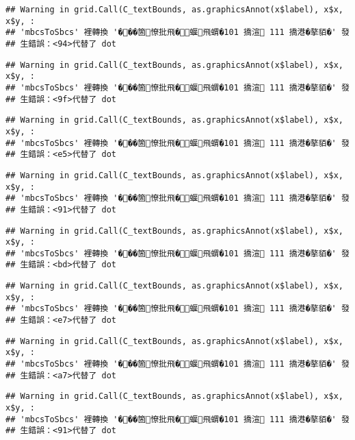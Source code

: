 \documentclass[
]{article}
\begin{document}
\begin{verbatim}
## Warning in grid.Call(C_textBounds, as.graphicsAnnot(x$label), x$x, x$y, :
## 'mbcsToSbcs' 裡轉換 '���箇憭批飛�蝘飛蝟�101 撟渲 111 撟港�摮貊�' 發
## 生錯誤：<94>代替了 dot
\end{verbatim}

\begin{verbatim}
## Warning in grid.Call(C_textBounds, as.graphicsAnnot(x$label), x$x, x$y, :
## 'mbcsToSbcs' 裡轉換 '���箇憭批飛�蝘飛蝟�101 撟渲 111 撟港�摮貊�' 發
## 生錯誤：<9f>代替了 dot
\end{verbatim}

\begin{verbatim}
## Warning in grid.Call(C_textBounds, as.graphicsAnnot(x$label), x$x, x$y, :
## 'mbcsToSbcs' 裡轉換 '���箇憭批飛�蝘飛蝟�101 撟渲 111 撟港�摮貊�' 發
## 生錯誤：<e5>代替了 dot
\end{verbatim}

\begin{verbatim}
## Warning in grid.Call(C_textBounds, as.graphicsAnnot(x$label), x$x, x$y, :
## 'mbcsToSbcs' 裡轉換 '���箇憭批飛�蝘飛蝟�101 撟渲 111 撟港�摮貊�' 發
## 生錯誤：<91>代替了 dot
\end{verbatim}

\begin{verbatim}
## Warning in grid.Call(C_textBounds, as.graphicsAnnot(x$label), x$x, x$y, :
## 'mbcsToSbcs' 裡轉換 '���箇憭批飛�蝘飛蝟�101 撟渲 111 撟港�摮貊�' 發
## 生錯誤：<bd>代替了 dot
\end{verbatim}

\begin{verbatim}
## Warning in grid.Call(C_textBounds, as.graphicsAnnot(x$label), x$x, x$y, :
## 'mbcsToSbcs' 裡轉換 '���箇憭批飛�蝘飛蝟�101 撟渲 111 撟港�摮貊�' 發
## 生錯誤：<e7>代替了 dot
\end{verbatim}

\begin{verbatim}
## Warning in grid.Call(C_textBounds, as.graphicsAnnot(x$label), x$x, x$y, :
## 'mbcsToSbcs' 裡轉換 '���箇憭批飛�蝘飛蝟�101 撟渲 111 撟港�摮貊�' 發
## 生錯誤：<a7>代替了 dot
\end{verbatim}

\begin{verbatim}
## Warning in grid.Call(C_textBounds, as.graphicsAnnot(x$label), x$x, x$y, :
## 'mbcsToSbcs' 裡轉換 '���箇憭批飛�蝘飛蝟�101 撟渲 111 撟港�摮貊�' 發
## 生錯誤：<91>代替了 dot
\end{verbatim}
\end{document}
